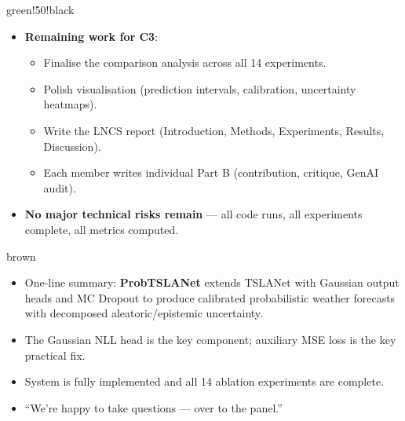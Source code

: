 \documentclass[11pt,a4paper]{article}
\begin{document}
\begin{speakerbox}{green!50!black}

\begin{talkingpoints}
\begin{itemize}[leftmargin=*]
    \item \textbf{Remaining work for C3}:
    \begin{itemize}
        \item Finalise the comparison analysis across all 14 experiments.
        \item Polish visualisation (prediction intervals, calibration, uncertainty heatmaps).
        \item Write the LNCS report (Introduction, Methods, Experiments, Results, Discussion).
        \item Each member writes individual Part B (contribution, critique, GenAI audit).
    \end{itemize}
    \item \textbf{No major technical risks remain} --- all code runs, all experiments complete, all metrics computed.
\end{itemize}
\end{talkingpoints}

\end{speakerbox}

\vspace{6pt}

\begin{speakerbox}{brown}

\begin{talkingpoints}
\begin{itemize}[leftmargin=*]
    \item One-line summary: \textbf{ProbTSLANet} extends TSLANet with Gaussian output heads and MC Dropout to produce calibrated probabilistic weather forecasts with decomposed aleatoric/epistemic uncertainty.
    \item The Gaussian NLL head is the key component; auxiliary MSE loss is the key practical fix.
    \item System is fully implemented and all 14 ablation experiments are complete.
    \item ``We're happy to take questions --- over to the panel.''
\end{itemize}
\end{talkingpoints}

\end{speakerbox}
\end{document}
